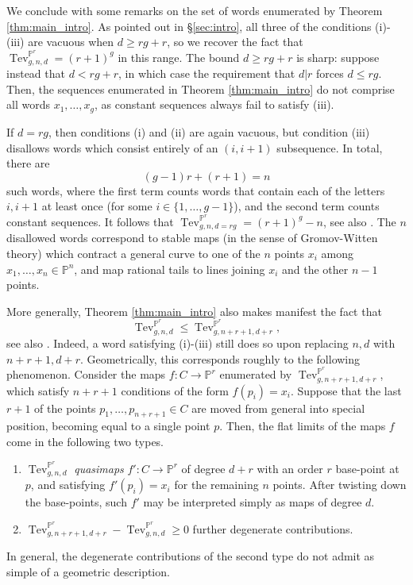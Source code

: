 \documentclass[12pt]{amsart}
\def\bP{\mathbb{P}}
\DeclareMathOperator{\Tev}{Tev}
\begin{document}
We conclude with some remarks on the set of words enumerated by Theorem \ref{thm:main_intro}. As pointed out in \S\ref{sec:intro}, all three of the conditions (i)-(iii) are vacuous when $d\ge rg+r$, so we recover the fact that $\Tev^{\bP^r}_{g,n,d}=(r+1)^g$ in this range. The bound $d\ge rg+r$ is sharp: suppose instead that $d<rg+r$, in which case the requirement that $d|r$ forces $d\le rg$. Then, the sequences enumerated in Theorem \ref{thm:main_intro} do not comprise all words $x_1,\ldots,x_g$, as constant sequences always fail to satisfy (iii). 

If $d=rg$, then conditions (i) and (ii) are again vacuous, but condition (iii) disallows words which consist entirely of an $(i,i+1)$ subsequence. In total, there are
\begin{equation*}
    (g-1)r+(r+1)=n
\end{equation*}
such words, where the first term counts words that contain each of the letters $i,i+1$ at least once (for some $i\in\{1,\ldots,g-1\}$), and the second term counts constant sequences. It follows that $\Tev^{\bP^r}_{g,n,d=rg}=(r+1)^g-n$, see also \cite[Example 1.6]{tev_Pr}. The $n$ disallowed words correspond to stable maps (in the sense of Gromov-Witten theory) which contract a general curve to one of the $n$ points $x_i$ among $x_1,\ldots,x_n\in\bP^n$, and map rational tails to lines joining $x_i$ and the other $n-1$ points.

More generally, Theorem \ref{thm:main_intro} also makes manifest the fact that
 \begin{equation*}
     \Tev^{\bP^r}_{g,n,d}\le \Tev^{\bP^r}_{g,n+r+1,d+r},
 \end{equation*}
see also \cite[\S 5.2]{tev_Pr}. Indeed, a word satisfying (i)-(iii) still does so upon replacing $n,d$ with $n+r+1,d+r$. Geometrically, this corresponds roughly to the following phenomenon. Consider the maps $f:C\to\bP^r$ enumerated by $\Tev^{\bP^r}_{g,n+r+1,d+r}$, which satisfy $n+r+1$ conditions of the form $f(p_i)=x_i$. Suppose that the last $r+1$ of the points $p_1,\ldots,p_{n+r+1}\in C$ are moved from general into special position, becoming equal to a single point $p$. Then, the flat limits of the maps $f$ come in the following two types.
\begin{enumerate}
\item $\Tev^{\bP^r}_{g,n,d}$ \emph{quasimaps} $f':C\to\bP^r$ of degree $d+r$ with an order $r$ base-point at $p$, and satisfying $f'(p_i)=x_i$ for the remaining $n$ points. After twisting down the base-points, such $f'$ may be interpreted simply as maps of degree $d$.
\item $\Tev^{\bP^r}_{g,n+r+1,d+r}-\Tev^{\bP^r}_{g,n,d}\ge 0$ further degenerate contributions.
\end{enumerate}
In general, the degenerate contributions of the second type do not admit as simple of a geometric description.
\end{document}
